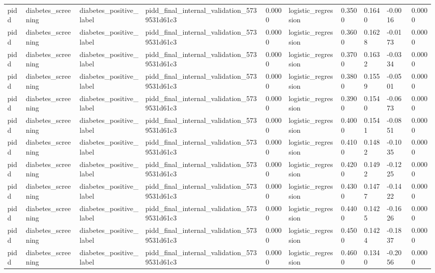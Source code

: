 \begin{tabular}{llllllllll}
pidd & diabetes\_screening & diabetes\_positive\_label & pidd\_final\_internal\_validation\_5739531d61c3 & 0.0000 & logistic\_regression & 0.3500 & 0.1640 & -0.0016 & 0.0000 \\
pidd & diabetes\_screening & diabetes\_positive\_label & pidd\_final\_internal\_validation\_5739531d61c3 & 0.0000 & logistic\_regression & 0.3600 & 0.1628 & -0.0173 & 0.0000 \\
pidd & diabetes\_screening & diabetes\_positive\_label & pidd\_final\_internal\_validation\_5739531d61c3 & 0.0000 & logistic\_regression & 0.3700 & 0.1632 & -0.0334 & 0.0000 \\
pidd & diabetes\_screening & diabetes\_positive\_label & pidd\_final\_internal\_validation\_5739531d61c3 & 0.0000 & logistic\_regression & 0.3800 & 0.1559 & -0.0501 & 0.0000 \\
pidd & diabetes\_screening & diabetes\_positive\_label & pidd\_final\_internal\_validation\_5739531d61c3 & 0.0000 & logistic\_regression & 0.3900 & 0.1540 & -0.0673 & 0.0000 \\
pidd & diabetes\_screening & diabetes\_positive\_label & pidd\_final\_internal\_validation\_5739531d61c3 & 0.0000 & logistic\_regression & 0.4000 & 0.1541 & -0.0851 & 0.0000 \\
pidd & diabetes\_screening & diabetes\_positive\_label & pidd\_final\_internal\_validation\_5739531d61c3 & 0.0000 & logistic\_regression & 0.4100 & 0.1482 & -0.1035 & 0.0000 \\
pidd & diabetes\_screening & diabetes\_positive\_label & pidd\_final\_internal\_validation\_5739531d61c3 & 0.0000 & logistic\_regression & 0.4200 & 0.1492 & -0.1225 & 0.0000 \\
pidd & diabetes\_screening & diabetes\_positive\_label & pidd\_final\_internal\_validation\_5739531d61c3 & 0.0000 & logistic\_regression & 0.4300 & 0.1477 & -0.1422 & 0.0000 \\
pidd & diabetes\_screening & diabetes\_positive\_label & pidd\_final\_internal\_validation\_5739531d61c3 & 0.0000 & logistic\_regression & 0.4400 & 0.1425 & -0.1626 & 0.0000 \\
pidd & diabetes\_screening & diabetes\_positive\_label & pidd\_final\_internal\_validation\_5739531d61c3 & 0.0000 & logistic\_regression & 0.4500 & 0.1424 & -0.1837 & 0.0000 \\
pidd & diabetes\_screening & diabetes\_positive\_label & pidd\_final\_internal\_validation\_5739531d61c3 & 0.0000 & logistic\_regression & 0.4600 & 0.1340 & -0.2056 & 0.0000 \\

\end{tabular}

